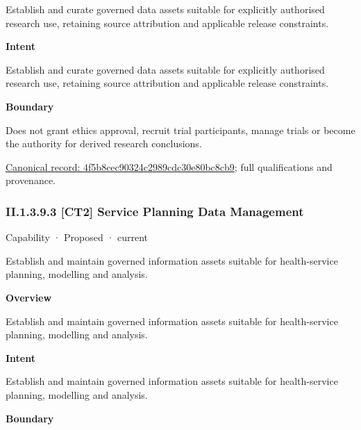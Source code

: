 Establish and curate governed data assets suitable for explicitly authorised research use, retaining source attribution and applicable release constraints.



\textbf{Intent}



Establish and curate governed data assets suitable for explicitly authorised research use, retaining source attribution and applicable release constraints.



\textbf{Boundary}



Does not grant ethics approval, recruit trial participants, manage trials or become the authority for derived research conclusions.


{\footnotesize \href{../../../../continuum/strategy/capability/4f5b8cec90324c2989cdc30e80bc8cb9.md}{Canonical record: 4f5b8cec90324c2989cdc30e80bc8cb9}; full qualifications and provenance.}\par
\subsubsection*{II.1.3.9.3 [CT2] Service Planning Data Management}
\label{navigation:II.1.3.9.3}

\label{element:4873cd4b960d45d8b93560d5c8b98500}
{\small Capability · Proposed · current}\par

Establish and maintain governed information assets suitable for health-service planning, modelling and analysis.



\textbf{Overview}



Establish and maintain governed information assets suitable for health-service planning, modelling and analysis.



\textbf{Intent}



Establish and maintain governed information assets suitable for health-service planning, modelling and analysis.



\textbf{Boundary}



